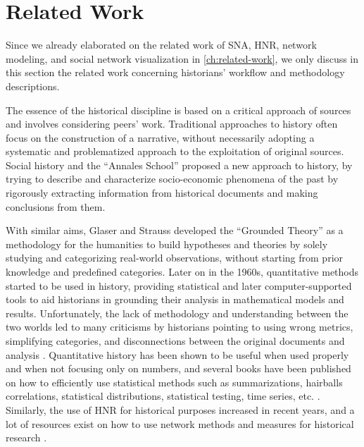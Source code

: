 \section{Related Work}

Since we already elaborated on the related work of SNA, HNR, network modeling, and social network visualization in \autoref{ch:related-work}, we only discuss in this section the related work concerning historians' workflow and methodology descriptions.

The essence of the historical discipline is based on a critical approach of sources and involves considering peers' work.
Traditional approaches to history often focus on the construction of a narrative, without necessarily adopting a systematic and problematized approach to the exploitation of original sources.
Social history and the ``Annales School'' proposed a new approach to history, by trying to describe and characterize socio-economic phenomena of the past by rigorously extracting information from historical documents and making conclusions from them.

With similar aims, Glaser and Strauss developed the ``Grounded Theory'' \cite{glaserDiscoveryGroundedTheory2010} as a methodology for the humanities to build hypotheses and theories by solely studying and categorizing real-world observations, without starting from prior knowledge and predefined categories.
Later on in the 1960s, quantitative methods started to be used in history, providing statistical and later computer-supported tools to aid historians in grounding their analysis in mathematical models and results.
Unfortunately, the lack of methodology and understanding between the two worlds led to many criticisms by historians pointing to using wrong metrics, simplifying categories, and disconnections between the original documents and analysis \cite{karila-cohenNouvellesCuisinesHistoire2018, lemercierBackSourcesPracticing2021}.
Quantitative history has been shown to be useful when used properly and when not focusing only on numbers, and several books have been published on how to efficiently use statistical methods such as summarizations, hairballs correlations, statistical distributions, statistical testing, time series, etc. \cite{hudsonHistoryNumbersIntroduction2016, lemercierQuantitativeMethodsHumanities2019}.
Similarly, the use of HNR for historical purposes increased in recent years, and a lot of resources exist on how to use network methods and measures for historical research \cite{lemercier12FormalNetwork2015, kerschbaumerPowerNetworksProspects2015}.

